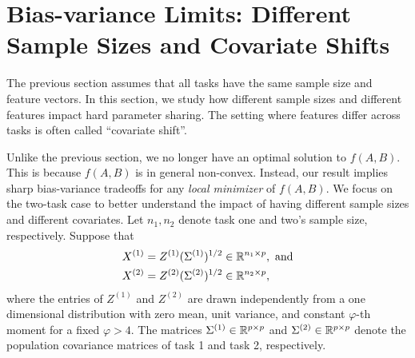 \section{Bias-variance Limits: Different Sample Sizes and Covariate Shifts}\label{sec_diff}

The previous section assumes that all tasks have the same sample size and feature vectors.
In this section, we study how different sample sizes and different features impact hard parameter sharing.
The setting where features differ across tasks is often called ``covariate shift''.

Unlike the previous section, we no longer have an optimal solution to $f(A, B)$.
This is because $f(A, B)$ is in general non-convex.
Instead, our result implies sharp bias-variance tradeoffs for any \emph{local minimizer} of $f(A, B)$.
We focus on the two-task case to better understand the impact of having different sample sizes and different covariates.
Let $n_1, n_2$ denote task one  and two's sample size, respectively.
Suppose that
\begin{align*}
	X^{(1)} &= Z^{(1)}(\Sigma^{(1)})^{1/2} \in \mathbb{R}^{n_1 \times p}, \text{ and} \\
	X^{(2)} &= Z^{(2)}(\Sigma^{(2)})^{1/2} \in \mathbb{R}^{n_2 \times p},
\end{align*}
where the entries of $Z^{(1)}$ and $ Z^{(2)}$ are drawn independently from a one dimensional distribution with zero mean, unit variance, and constant $\varphi$-th moment for a fixed $\varphi > 4$. The matrices $\Sigma^{(1)}\in \mathbb{R}^{p\times p}$ and $\Sigma^{(2)}\in \mathbb{R}^{p\times p}$ denote the population covariance matrices of task 1 and task 2, respectively.

